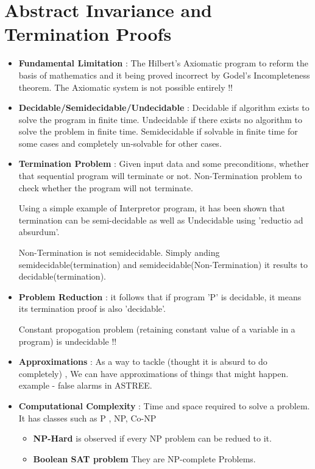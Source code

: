 \chapter{Abstract Invariance and Termination Proofs}

\begin{itemize}

	\item{\textbf{Fundamental Limitation} : The Hilbert's Axiomatic program to reform the basis of mathematics and it being proved incorrect by Godel's Incompleteness theorem. The Axiomatic system is not possible entirely !! 
	}

	\item{\textbf{Decidable/Semidecidable/Undecidable} : Decidable if algorithm exists to solve the program in finite time.
	Undecidable if there exists no algorithm to solve the problem in finite time.
	Semidecidable if solvable in finite time for some cases and completely un-solvable for other cases. 
	}

	\item{\textbf{Termination Problem} : Given input data and some preconditions, whether that sequential program will terminate or not. Non-Termination problem to check whether the program will not terminate.

	Using a simple example of Interpretor program, it has been shown that termination can be semi-decidable as well as Undecidable using 'reductio ad absurdum'.

	Non-Termination is not semidecidable. Simply anding semidecidable(termination) and semidecidable(Non-Termination) it results to decidable(termination).
	}

	\item{\textbf{Problem Reduction} : it follows that if program 'P' is decidable, it means its termination proof is also 'decidable'.

	Constant propogation problem (retaining constant value of a variable in a program) is undecidable !!
	}

	\item{\textbf{Approximations} : As a way to tackle (thought it is absurd to do completely) , We can have approximations of things that might happen. example - false alarms in ASTREE.
	}

	\item{\textbf{Computational Complexity} : 
	Time and space required to solve a problem. It has classes such as P , NP, Co-NP

	\begin{itemize}
		\item{\textbf{NP-Hard} is observed if every NP problem can be redued to it. }
		\item{\textbf{Boolean SAT problem} They are NP-complete Problems.

}
\end{itemize}}
\end{itemize}
